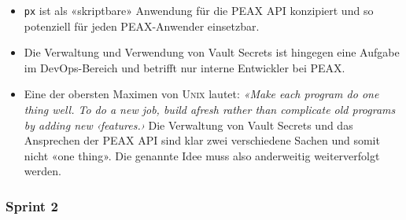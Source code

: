 \begin{itemize}
\begin{itemize}
        \item \texttt{px} ist als «skriptbare» Anwendung für die PEAX API konzipiert und so potenziell für jeden PEAX-Anwender einsetzbar.
        \item Die Verwaltung und Verwendung von Vault Secrets ist hingegen eine Aufgabe im DevOps-Bereich und betrifft nur interne Entwickler bei PEAX.
        \item Eine der obersten Maximen von \textsc{Unix} lautet: \textit{«Make each program do one thing well. To do a new job, build afresh rather than complicate old programs by adding new ‹features.›} \cite[S. 3]{unixtimesharing} Die Verwaltung von Vault Secrets und das Ansprechen der PEAX API sind klar zwei verschiedene Sachen und somit nicht «one thing». Die genannte Idee muss also anderweitig weiterverfolgt werden.
    \end{itemize}
\end{itemize}

\subsubsection{Sprint 2}


